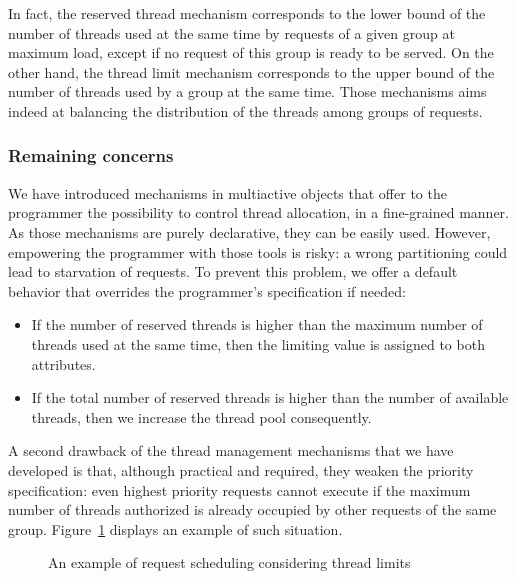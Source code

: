 \documentclass[11pt]{report}
\begin{document}
In fact, the reserved thread mechanism corresponds to the lower bound of the number of threads used at the same time by requests of a given group at maximum load, except if no request of this group is ready to be served. On the other hand, the thread limit mechanism corresponds to the upper bound of the number of threads used by a group at the same time. Those mechanisms aims indeed at balancing the distribution of the threads among groups of requests.

\subsubsection{Remaining concerns}
We have introduced mechanisms in multiactive objects that offer to the programmer the possibility to control thread allocation, in a fine-grained manner. As those mechanisms are purely declarative, they can be easily used. However, empowering the programmer with those tools is risky: a wrong partitioning could lead to starvation of requests. To prevent this problem, we offer a default behavior that overrides the programmer's specification if needed:
\begin{itemize}
\item If the number of reserved threads is higher than the maximum number of threads used at the same time, then the limiting value is assigned to both attributes.
\item If the total number of reserved threads is higher than the number of available threads, then we increase the thread pool consequently.
\end{itemize}
A second drawback of the thread management mechanisms that we have developed is that, although practical and required, they weaken the priority specification: even highest priority requests cannot execute if the maximum number of threads authorized is already occupied by other requests of the same group. Figure~\ref{fig:thread_limit} displays an example of such situation.

\begin{figure}[!ht]
      \caption{An example of request scheduling considering thread limits}
      \label{fig:thread_limit} 
\end{figure}
\end{document}
